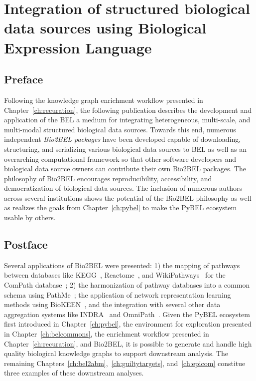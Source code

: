 \chapter{Integration of structured biological data sources using Biological Expression Language}
\label{ch:bio2bel}

\section*{Preface}

Following the knowledge graph enrichment workflow presented in Chapter~\ref{ch:recuration}, the following publication describes the development and application of the \ac{BEL} a medium for integrating heterogeneous, multi-scale, and multi-modal structured biological data sources.
Towards this end, numerous independent \textit{Bio2BEL packages} have been developed capable of downloading, structuring, and serializing various biological data sources to \ac{BEL} as well as an overarching computational framework so that other software developers and biological data source owners can contribute their own Bio2BEL packages.
The philosophy of Bio2BEL encourages reproducibility, accessibility, and democratization of biological data sources.
The inclusion of numerous authors across several institutions shows the potential of the Bio2BEL philosophy as well as realizes the goals from Chapter~\ref{ch:pybel} to make the PyBEL ecosystem usable by others.

\vspace*{\fill}



\section*{Postface}

Several applications of Bio2BEL were presented: 1) the mapping of pathways between databases like \ac{KEGG}~\cite{Kanehisa2017}, Reactome~\cite{Fabregat2016}, and WikiPathways~\cite{Slenter2018} for the ComPath database~\cite{Domingo-Fernandez2018}; 2) the harmonization of pathway databases into a common schema using PathMe~\cite{Domingo-Fernandez2019a}; the application of network representation learning methods using BioKEEN~\cite{Ali2019}, and the integration with several other data aggregation systems like \ac{INDRA}~\cite{Gyori2017} and OmniPath~\cite{Turei2016}.
Given the PyBEL ecosystem first introduced in Chapter~\ref{ch:pybel}, the environment for exploration presented in Chapter~\ref{ch:belcommons}, the enrichment workflow presented in Chapter~\ref{ch:recuration}, and Bio2BEL, it is possible to generate and handle high quality biological knowledge graphs to support downstream analysis.
The remaining Chapters~\ref{ch:bel2abm},~\ref{ch:guiltytargets}, and~\ref{ch:epicom} constitue three examples of these downstream analyses.
